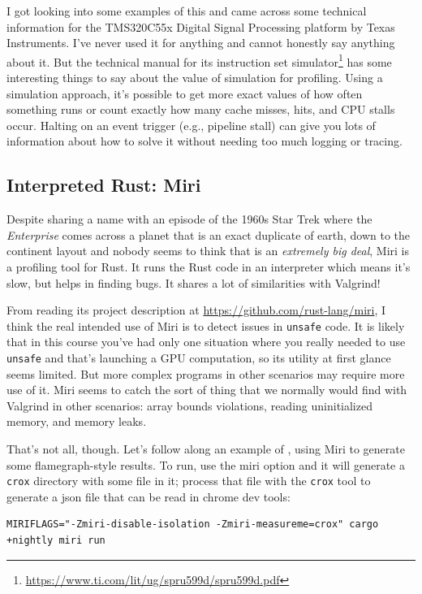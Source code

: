I got looking into some examples of this and came across some technical information for the TMS320C55x Digital Signal Processing platform by Texas Instruments.  I've never used it for anything and cannot honestly say anything about it. But the technical manual for its instruction set simulator\footnote{\url{https://www.ti.com/lit/ug/spru599d/spru599d.pdf}} has some interesting things to say about the value of simulation for profiling. Using a simulation approach, it's possible to get more exact values of how often something runs or count exactly how many cache misses, hits, and CPU stalls occur. Halting on an event trigger (e.g., pipeline stall) can give you lots of information about how to solve it without needing too much logging or tracing.

\subsection*{Interpreted Rust: Miri}
Despite sharing a name with an episode of the 1960s Star Trek where the \textit{Enterprise} comes across a planet that is an exact duplicate of earth, down to the continent layout and nobody seems to think that is an \textit{extremely big deal}, Miri is a profiling tool for Rust. It runs the Rust code in an interpreter which means it's slow, but helps in finding bugs. It shares a lot of similarities with Valgrind!

From reading its project description at \url{https://github.com/rust-lang/miri}, I think the real intended use of Miri is to detect issues in \texttt{unsafe} code. It is likely that in this course you've had only one situation where you really needed to use \texttt{unsafe} and that's launching a GPU computation, so its utility at first glance seems limited. But more complex programs in other scenarios may require more use of it. Miri seems to catch the sort of thing that we normally would find with Valgrind in other scenarios: array bounds violations, reading uninitialized memory, and memory leaks.

That's not all, though. Let's follow along an example of \cite{miri}, using Miri to generate some flamegraph-style results. To run, use the miri option and it will generate a \texttt{crox} directory with some file in it; process that file with the \texttt{crox} tool to generate a json file that can be read in chrome dev tools:

\begin{lstlisting}
MIRIFLAGS="-Zmiri-disable-isolation -Zmiri-measureme=crox" cargo +nightly miri run
\end{lstlisting}

